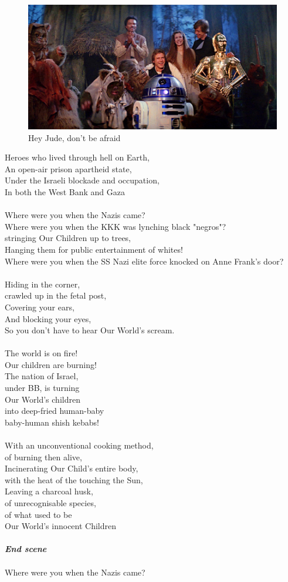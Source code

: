 \documentclass[16pt,openany,oneside]{book}
\begin{document}
\begin{figure}[H]
    \centering
    \includegraphics[width=0.5\linewidth]{assets/star_wars/endor_celebration.jpg}
    \caption{Hey Jude, don't be afraid}
    \label{fig:endor-celebration}
\end{figure}

\noindent Heroes who lived through hell on Earth, \\ 
An open-air prison apartheid state, \\  
Under the Israeli blockade and occupation, \\ 
In both the West Bank and Gaza
\\\\
Where were you when the Nazis came? \\ 
Where were you when the KKK was lynching black "negros"? \\  
stringing Our Children up to trees, \\ 
Hanging them for public entertainment of whites! \\ 
Where were you when the SS Nazi elite force knocked on Anne Frank's door? 
\\\\
Hiding in the corner, \\ 
crawled up in the fetal post, \\
Covering your ears, \\
And blocking your eyes, \\
So you don't have to hear Our World's scream. 
\\\\
The world is on fire! \\
Our children are burning! \\ 
The nation of Israel, \\ 
under BB, is turning \\ 
Our World's children \\ 
into deep-fried human-baby \\ 
baby-human shish kebabs!
\\\\
With an unconventional cooking method, \\ 
of burning then alive, \\
Incinerating Our Child's entire body, \\
with the heat of the touching the Sun, \\
Leaving a charcoal husk, \\ 
of unrecognisable species, \\ 
of what used to be \\ 
Our World's innocent Children
\\\\
\textbf{\textit{End scene}}
\\\\
Where were you when the Nazis came?
\end{document}
